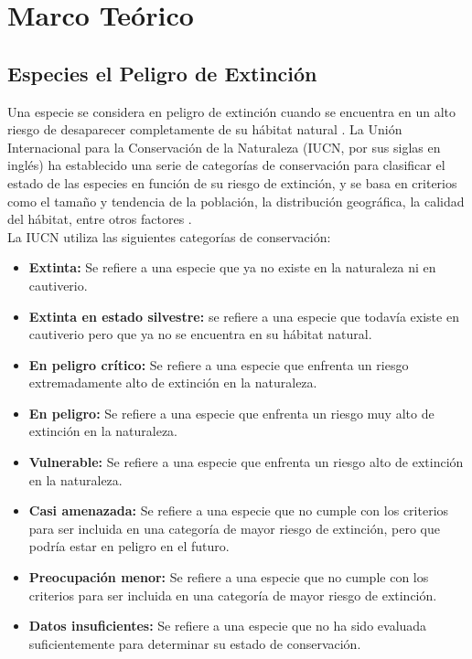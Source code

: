 \chapter{Marco Teórico} 
\section{Especies el Peligro de Extinción}
Una especie se considera en peligro de extinción cuando se encuentra en un alto riesgo de desaparecer completamente de su hábitat natural \cite{43}. La Unión Internacional para la Conservación de la Naturaleza (IUCN, por sus siglas en inglés) ha establecido una serie de categorías de conservación para clasificar el estado de las especies en función de su riesgo de extinción, y se basa en criterios como el tamaño y tendencia de la población, la distribución geográfica, la calidad del hábitat, entre otros factores \cite{44}.\\
La IUCN utiliza las siguientes categorías de conservación:

\begin{itemize}
\item \textbf{Extinta:} Se refiere a una especie que ya no existe en la naturaleza ni en cautiverio.
\item \textbf{Extinta en estado silvestre:} se refiere a una especie que todavía existe en cautiverio pero que ya no se encuentra en su hábitat natural.
\item \textbf{En peligro crítico:} Se refiere a una especie que enfrenta un riesgo extremadamente alto de extinción en la naturaleza.
\item \textbf{En peligro:} Se refiere a una especie que enfrenta un riesgo muy alto de extinción en la naturaleza.
\item \textbf{Vulnerable:} Se refiere a una especie que enfrenta un riesgo alto de extinción en la naturaleza.
\item \textbf{Casi amenazada:} Se refiere a una especie que no cumple con los criterios para ser incluida en una categoría de mayor riesgo de extinción, pero que podría estar en peligro en el futuro.
\item \textbf{Preocupación menor:} Se refiere a una especie que no cumple con los criterios para ser incluida en una categoría de mayor riesgo de extinción.
\item \textbf{Datos insuficientes:} Se refiere a una especie que no ha sido evaluada suficientemente para determinar su estado de conservación.
\end{itemize}


